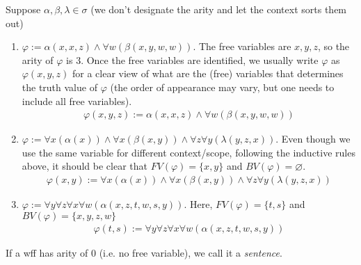 \documentclass{treatise}
\begin{document}
\begin{example}
Suppose $\alpha, \beta, \lambda \in \sigma$ (we don't designate the arity and let the context sorts them out)
\begin{enumerate}
    \item $\varphi := \alpha(x, x, z) \wedge \forall w (\beta(x, y, w, w))$. The free variables are $x, y, z$, so the arity of $\varphi$ is $3$. Once the free variables are identified, we usually write $\varphi$ as $\varphi(x, y, z)$ for a clear view of what are the (free) variables that determines the truth value of $\varphi$ (the order of appearance may vary, but one needs to include all free variables).
    \begin{align*}
        \varphi(x, y, z) := \alpha(x, x, z) \wedge \forall w (\beta(x, y, w, w))
    \end{align*}
    \item $\varphi := \forall x (\alpha(x)) \wedge \forall x (\beta(x, y)) \wedge \forall z \forall y (\lambda(y, z, x))$. Even though we use the same variable for different context/scope, following the inductive rules above, it should be clear that $FV(\varphi) = \{ x, y \}$ and $BV(\varphi) = \varnothing$.
    \begin{align*}
        \varphi(x, y) := \forall x (\alpha(x)) \wedge \forall x (\beta(x, y)) \wedge \forall z \forall y (\lambda(y, z, x))
    \end{align*}
    \item $\varphi := \forall y \forall z \forall x \forall w (\alpha(x, z, t, w, s, y))$. Here, $FV(\varphi) = \{ t, s \}$ and $BV(\varphi) = \{  x, y, z, w \}$
    \begin{align*}
        \varphi(t, s) := \forall y \forall z \forall x \forall w (\alpha(x, z, t, w, s, y))
    \end{align*}
\end{enumerate}
\end{example}
If a wff has arity of $0$ (i.e. no free variable), we call it a \emph{sentence}.
\end{document}
